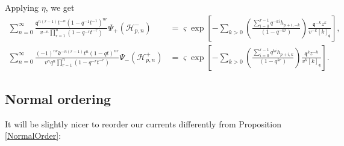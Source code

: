 \documentclass{amsart}
\newcommand{\qqq}{\mathfrak{q}}
\newcommand{\ddd}{\mathfrak{d}}
\theoremstyle{remark}
\numberwithin{thm}{section}
\numberwithin{equation}{section}
\begin{document}
Applying $\eta$, we get
\begin{align*}
\sum_{n=0}^\infty\frac{\qqq^{n(r-1)}t^{-n}\left( 1-q^{-1}t^{-1} \right)^{nr}}{v^{-n}\prod_{r=1}^n\left( 1-q^{-r}t^{-r} \right)}
\Psi_+(\mathcal{H}^-_{p,n})
&= \varsigma\exp\left[-\sum_{k>0}\left(\frac{\sum_{i=0}^{r-1}q^{- ki}h_{p+i,- k}}{(1-q^{- kr})}\right)\frac{\qqq^{- k} z^{ k}}{v^{-k}[ k]_{\qqq}} \right],\\
\sum_{n=0}^\infty\frac{(-1)^{nr}\ddd^{-n(r-1)}t^{n}\left(1- qt \right)^{nr}}{v^nq^{n}\prod_{r=1}^n\left(1- q^{-r}t^{-r} \right)}
\Psi_-\left( \mathcal{H}_{p,n}^+ \right)
&=\varsigma\exp\left[-\sum_{k>0}\left(\frac{\sum_{i=0}^{r-1}q^{ ki}h_{p+i, k}}{(1-q^{ kr})}\right)\frac{\qqq^{ k} z^{- k}}{v^k[ k]_{\qqq}} \right].
\end{align*}

\subsection{Normal ordering}
It will be slightly nicer to reorder our currents differently from Proposition \ref{NormalOrder}:
\end{document}
